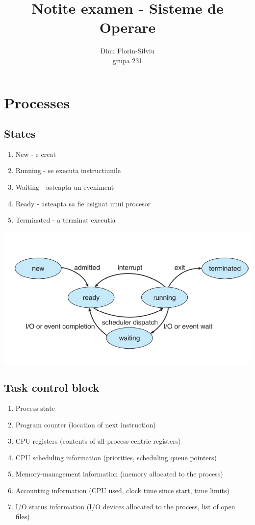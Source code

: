 \documentclass{article}
\title{Notite examen - Sisteme de Operare}
\date{}
\author{Dinu Florin-Silviu \\ grupa 231}
\begin{document}
\maketitle
\tableofcontents

\newpage
{}

\section[Ch3 Processes]{Processes}
\subsection*{States}
\begin{enumerate}
    \item New - e creat
    \item Running - se executa instructiunile
    \item Waiting - asteapta un eveniment
    \item Ready - asteapta sa fie asignat unui procesor
    \item Terminated - a terminat executia
\end{enumerate}

\begin{center}
    \includegraphics[scale=0.4]{1_procese.png}
\end{center}

\subsection*{Task control block}
\begin{enumerate}
    \item Process state
    \item Program counter (location of next instruction)
    \item CPU registers (contents of all process-centric registers)
    \item CPU scheduling information (priorities, scheduling queue pointers)
    \item Memory-management information (memory allocated to the process)
    \item Accounting information (CPU used, clock time since start, time limits)
    \item I/O status information (I/O devices allocated to the process, list of open files)
\end{enumerate}
\end{document}
